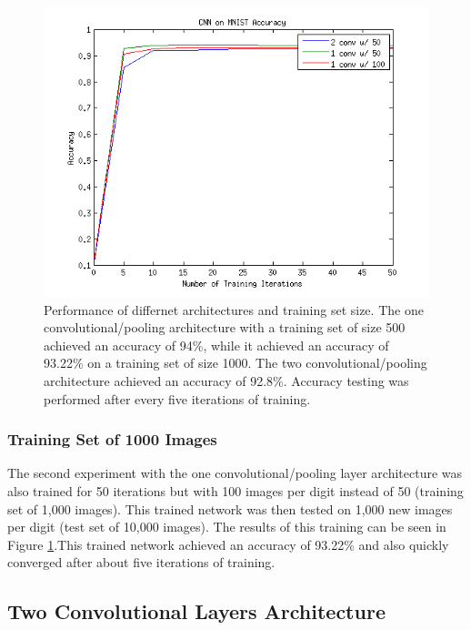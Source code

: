 \documentclass[10pt,twocolumn,letterpaper]{article}
\begin{document}
\begin{figure}
  \includegraphics[scale=0.55]{AccPlot}
  \caption{Performance of differnet architectures and training set size. The one convolutional/pooling architecture with a training set
  of size 500 achieved an accuracy of 94\%, while it achieved an accuracy of 93.22\% on a training set of size 1000. The two convolutional/pooling
  architecture achieved an accuracy of 92.8\%. Accuracy testing was performed after every five iterations of training.}
  \label{fig:accplot}
\end{figure}

\subsubsection{Training Set of 1000 Images}

The second experiment with the one convolutional/pooling layer architecture was also trained
for 50 iterations but with 100 images per digit instead of 50 (training set of 1,000 images).
This trained network was then tested on 1,000 new images per digit (test set of 10,000 images).
The results of this training can be seen in Figure \ref{fig:accplot}.This trained network
achieved an accuracy of 93.22\% and also quickly converged after about five iterations of training.

\subsection{Two Convolutional Layers Architecture}
\end{document}
